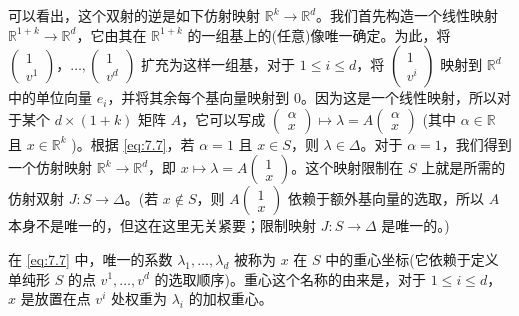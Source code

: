可以看出，这个双射的逆是如下仿射映射 \({\mathbb{R}}^{k} \rightarrow  {\mathbb{R}}^{d}\)。我们首先构造一个线性映射 \({\mathbb{R}}^{1 + k} \rightarrow  {\mathbb{R}}^{d}\)，它由其在 \({\mathbb{R}}^{1 + k}\) 的一组基上的(任意)像唯一确定。为此，将 \(\left( \begin{matrix} 1 \\  {v}^{1} \end{matrix}\right)，\ldots,\left( \begin{matrix} 1 \\  {v}^{d} \end{matrix}\right)\) 扩充为这样一组基，对于 \(1 \leq  i \leq  d\)，将 \(\left( \begin{matrix} 1 \\  {v}^{i} \end{matrix}\right)\) 映射到 \({\mathbb{R}}^{d}\) 中的单位向量 \({e}_{i}\)，并将其余每个基向量映射到 0。因为这是一个线性映射，所以对于某个 \(d \times  \left( {1 + k}\right)\) 矩阵 \(A\)，它可以写成 \(\left( \begin{array}{l} \alpha \\  x \end{array}\right)  \mapsto  \lambda  = A\left( \begin{array}{l} \alpha \\  x \end{array}\right)\) (其中 \(\alpha  \in  \mathbb{R}\) 且 \(x \in  {\mathbb{R}}^{k}\) )。根据 \eqref{eq:7.7}，若 \(\alpha  = 1\) 且 \(x \in  S\)，则 \(\lambda  \in  \Delta\)。对于 \(\alpha  = 1\)，我们得到一个仿射映射 \({\mathbb{R}}^{k} \rightarrow  {\mathbb{R}}^{d}\)，即 \(x \mapsto  \lambda  = A\left( \begin{array}{l} 1 \\  x \end{array}\right)\)。这个映射限制在 \(S\) 上就是所需的仿射双射 \(J : S \rightarrow  \Delta\)。(若 \(x \notin  S\)，则 \(A\left( \begin{array}{l} 1 \\  x \end{array}\right)\) 依赖于额外基向量的选取，所以 \(A\) 本身不是唯一的，但这在这里无关紧要；限制映射 \(J : S \rightarrow  \Delta\) 是唯一的。)

在 \eqref{eq:7.7} 中，唯一的系数 \({\lambda }_{1},\ldots,{\lambda }_{d}\) 被称为 \(x\) 在 \(S\) 中的重心坐标(它依赖于定义单纯形 \(S\) 的点 \({v}^{1},\ldots,{v}^{d}\) 的选取顺序)。重心这个名称的由来是，对于 \(1 \leq  i \leq  d\)， \(x\) 是放置在点 \({v}^{i}\) 处权重为 \({\lambda }_{i}\) 的加权重心。

